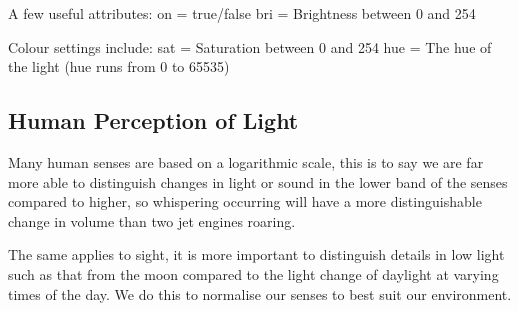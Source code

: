 A few useful attributes: on = true/false bri = Brightness between 0 and
254

Colour settings include: sat = Saturation between 0 and 254 hue = The
hue of the light (hue runs from 0 to 65535)

\subsection{Human Perception of Light}\label{human-perception-of-light}

Many human senses are based on a logarithmic scale, this is to say we
are far more able to distinguish changes in light or sound in the lower
band of the senses compared to higher, so whispering occurring will have
a more distinguishable change in volume than two jet engines roaring.

The same applies to sight, it is more important to distinguish details
in low light such as that from the moon compared to the light change of
daylight at varying times of the day. We do this to normalise our senses
to best suit our environment.
